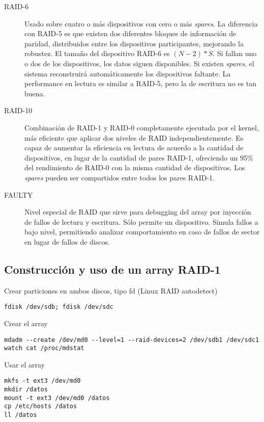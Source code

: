\begin{description}
\item [RAID-6]
Usado sobre cuatro o más dispositivos con cero o más \emph{spares}. La diferencia con RAID-5 es que existen dos diferentes bloques de información de paridad, distribuidos entre los dispositivos participantes, mejorando la robustez. El tamaño del dispositivo RAID-6 es $(N-2)*S$. Si fallan uno o dos de los dispositivos, los datos siguen disponibles. Si existen \emph{spares}, el sistema reconstruirá automáticamente los dispositivos faltante. La performance en lectura es similar a RAID-5, pero la de escritura no es tan buena.

\item [RAID-10]
Combinación de RAID-1 y RAID-0 completamente ejecutada por el kernel, más eficiente que aplicar dos niveles de RAID independientemente. Es capaz de aumentar la eficiencia en lectura de acuerdo a la cantidad de dispositivos, en lugar de la cantidad de pares RAID-1, ofreciendo un 95\% del rendimiento de RAID-0 con la misma cantidad de dispositivos. Los \emph{spares} pueden ser compartidos entre todos los pares RAID-1.



\item [FAULTY]

Nivel especial de RAID que sirve para debugging del array por inyección de fallos de lectura y escritura. Sólo permite un dispositivo. Simula fallos a bajo nivel, permitiendo analizar comportamiento en caso de fallos de sector en lugar de fallos de discos.

\end{description}



\subsection{Construcción y uso de un array RAID-1}



Crear particiones en ambos discos, tipo fd (Linux RAID autodetect)
\begin{lstlisting}
fdisk /dev/sdb; fdisk /dev/sdc
\end{lstlisting}

Crear el array
\begin{lstlisting}
mdadm --create /dev/md0 --level=1 --raid-devices=2 /dev/sdb1 /dev/sdc1
watch cat /proc/mdstat
\end{lstlisting}

Usar el array
\begin{lstlisting}
mkfs -t ext3 /dev/md0
mkdir /datos
mount -t ext3 /dev/md0 /datos
cp /etc/hosts /datos
ll /datos
\end{lstlisting}

